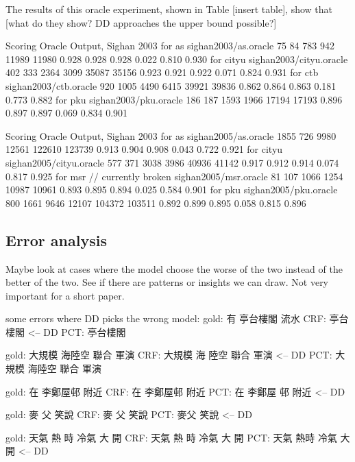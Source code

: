 The results of this oracle experiment, shown in Table [insert table], show that [what do they show? DD approaches the upper bound possible?]

Scoring Oracle Output, Sighan 2003
for as
	sighan2003/as.oracle	75	84	783	942	11989	11980	0.928	0.928	0.928	0.022	0.810	0.930
for cityu
	sighan2003/cityu.oracle	402	333	2364	3099	35087	35156	0.923	0.921	0.922	0.071	0.824	0.931
for ctb
	sighan2003/ctb.oracle	920	1005	4490	6415	39921	39836	0.862	0.864	0.863	0.181	0.773	0.882
for pku
	sighan2003/pku.oracle	186	187	1593	1966	17194	17193	0.896	0.897	0.897	0.069	0.834	0.901

Scoring Oracle Output, Sighan 2003
for as
	sighan2005/as.oracle	1855	726	9980	12561	122610	123739	0.913	0.904	0.908	0.043	0.722	0.921
for cityu
	sighan2005/cityu.oracle	577	371	3038	3986	40936	41142	0.917	0.912	0.914	0.074	0.817	0.925
for msr // currently broken
	sighan2005/msr.oracle	81	107	1066	1254	10987	10961	0.893	0.895	0.894	0.025	0.584	0.901
for pku
	sighan2005/pku.oracle	800	1661	9646	12107	104372	103511	0.892	0.899	0.895	0.058	0.815	0.896


\subsection{Error analysis}
Maybe look at cases where the model choose the worse of the two instead of the better of the two. See if there are patterns or insights we can draw. Not very important for a short paper.

some errors where DD picks the wrong model:
gold: 有 亭台樓閣 流水
CRF: 亭台 樓閣  <-- DD
PCT: 亭台樓閣

gold: 大規模 海陸空 聯合 軍演   
CRF: 大規模 海 陸空 聯合 軍演   <-- DD
PCT: 大規模 海陸空 聯合 軍演   


gold: 在 李鄭屋邨 附近
CRF: 在 李鄭屋邨 附近
PCT: 在 李鄭屋 邨 附近   <-- DD

gold: 麥 父 笑說
CRF:  麥 父 笑說
PCT: 麥父 笑說    <-- DD

gold: 天氣 熱 時 冷氣 大 開     
CRF: 天氣 熱 時 冷氣 大 開     
PCT: 天氣 熱時 冷氣 大 開     <-- DD
